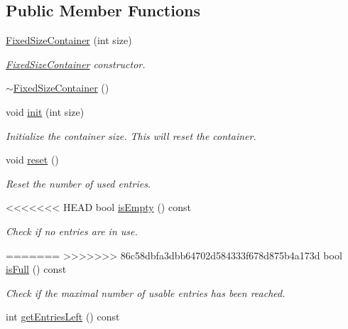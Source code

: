 \subsection*{Public Member Functions}
\begin{DoxyCompactItemize}
\item 
\mbox{\hyperlink{classr3_1_1_fixed_size_container_a9396266faf0a5d5d75ea50f0d74d5267}{Fixed\+Size\+Container}} (int size)
\begin{DoxyCompactList}\small\item\em \mbox{\hyperlink{classr3_1_1_fixed_size_container}{Fixed\+Size\+Container}} constructor. \end{DoxyCompactList}\item 
\mbox{\hyperlink{classr3_1_1_fixed_size_container_af235a796be8de5a9e96c788b676b59fa}{$\sim$\+Fixed\+Size\+Container}} ()
\item 
void \mbox{\hyperlink{classr3_1_1_fixed_size_container_a75dddd29ba901e97ba6133a6c388b357}{init}} (int size)
\begin{DoxyCompactList}\small\item\em Initialize the container size. This will reset the container. \end{DoxyCompactList}\item 
void \mbox{\hyperlink{classr3_1_1_fixed_size_container_a56aa3725cacf135fc1eacddbf424c868}{reset}} ()
\begin{DoxyCompactList}\small\item\em Reset the number of used entries. \end{DoxyCompactList}\item 
<<<<<<< HEAD
bool \mbox{\hyperlink{classr3_1_1_fixed_size_container_adde8deee5146abd862ef32e1ac3bb879}{is\+Empty}} () const
\begin{DoxyCompactList}\small\item\em Check if no entries are in use. \end{DoxyCompactList}\item 
=======
>>>>>>> 86c58dbfa3dbb64702d584333f678d875b4a173d
bool \mbox{\hyperlink{classr3_1_1_fixed_size_container_ae3beb2a45a67d3bd4f6cb32f39805889}{is\+Full}} () const
\begin{DoxyCompactList}\small\item\em Check if the maximal number of usable entries has been reached. \end{DoxyCompactList}\item 
int \mbox{\hyperlink{classr3_1_1_fixed_size_container_a5d21f93fcf7117df372d321c0d9102fa}{get\+Entries\+Left}} () const

\end{DoxyCompactItemize}
